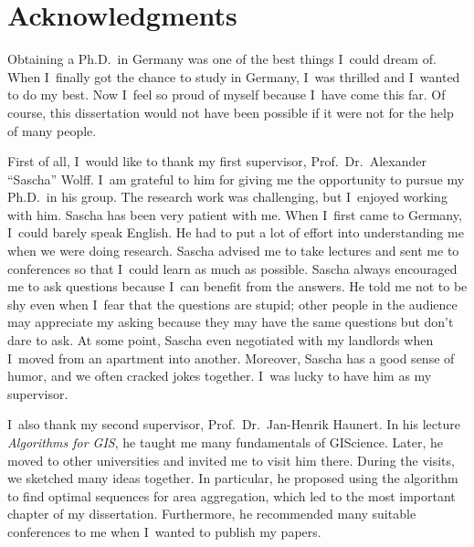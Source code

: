 
\chapter*{Acknowledgments}%
%

Obtaining a Ph.D.\ in Germany was 
one of the best things I~could dream of.
When I~finally got the chance to study in Germany,
I~was thrilled and I~wanted to do my best.
Now I~feel so proud of myself because I~have come this far.
Of course, this dissertation would not have been possible
if it were not for the help of many people.

First of all, I~would like to thank my first supervisor, 
Prof.\ Dr.\ Alexander ``Sascha'' Wolff.
I~am grateful to him for giving me 
the opportunity to pursue my Ph.D.\ in his group.
The research work was challenging,
but I~enjoyed working with him.
Sascha has been very patient with me.
When I~first came to Germany, I~could barely speak English.
He had to put a lot of effort into understanding me
when we were doing research.
Sascha advised me to take lectures and sent me to conferences
so that I~could learn as much as possible.
Sascha always encouraged me to ask questions
because I~can benefit from the answers.
He told me not to be shy even when 
I~fear that the questions are stupid;
other people in the audience may appreciate my asking
because they may have the same questions
but don't dare to ask.
At some point,
Sascha even negotiated with my landlords 
when I~moved from an apartment into another.
Moreover, Sascha has a good sense of humor, 
and we often cracked jokes together.
I~was lucky to have him as my supervisor.

I~also thank my second supervisor, 
Prof.\ Dr.\ Jan-Henrik Haunert.  
In his lecture \emph{Algorithms for GIS}, 
he taught me many fundamentals of GIScience.  
Later, he moved to other universities 
and invited me to visit him there.
During the visits, we sketched many ideas together.
In particular, he proposed %
using the \Astar algorithm 
to find optimal sequences for area aggregation,
which led to the most important chapter of my dissertation.
Furthermore, he recommended many suitable conferences to me
when I~wanted to publish my papers.

